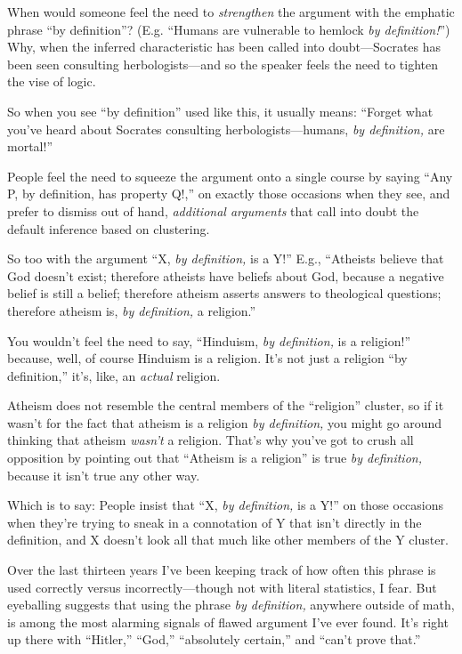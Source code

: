 {
 When would someone feel the need to \textit{strengthen} the
argument with the emphatic phrase ``by
definition''? (E.g. ``Humans are
vulnerable to hemlock \textit{by definition!}'') Why,
when the inferred characteristic has been called into doubt---Socrates
has been seen consulting herbologists---and so the speaker feels the
need to tighten the vise of logic.}

{
 So when you see ``by
definition'' used like this, it usually means:
``Forget what you've heard about
Socrates consulting herbologists---humans, \textit{by definition,} are
mortal!''}

{
 People feel the need to squeeze the argument onto a single course
by saying ``Any P, by definition, has property
Q!,'' on exactly those occasions when they see, and
prefer to dismiss out of hand, \textit{additional arguments} that call
into doubt the default inference based on clustering.}

{
 So too with the argument ``X, \textit{by
definition,} is a Y!'' E.g.,
``Atheists believe that God doesn't
exist; therefore atheists have beliefs about God, because a negative
belief is still a belief; therefore atheism asserts answers to
theological questions; therefore atheism is, \textit{by definition,} a
religion.''}

{
 You wouldn't feel the need to say,
``Hinduism, \textit{by definition,} is a
religion!'' because, well, of course Hinduism is a
religion. It's not just a religion
``by definition,''
it's, like, an \textit{actual} religion.}

{
 Atheism does not resemble the central members of the
``religion'' cluster, so if it
wasn't for the fact that atheism is a religion
\textit{by definition,} you might go around thinking that atheism
\textit{wasn't} a religion. That's why
you've got to crush all opposition by pointing out that
``Atheism is a religion'' is true
\textit{by definition,} because it isn't true any other
way.}

{
 Which is to say: People insist that ``X,
\textit{by definition,} is a Y!'' on those occasions
when they're trying to sneak in a connotation of Y that
isn't directly in the definition, and X
doesn't look all that much like other members of the Y
cluster.}

{
 Over the last thirteen years I've been keeping
track of how often this phrase is used correctly versus
incorrectly---though not with literal statistics, I fear. But
eyeballing suggests that using the phrase \textit{by definition,}
anywhere outside of math, is among the most alarming signals of flawed
argument I've ever found. It's right up
there with ``Hitler,''
``God,''
``absolutely certain,'' and
``can't prove
that.''}

